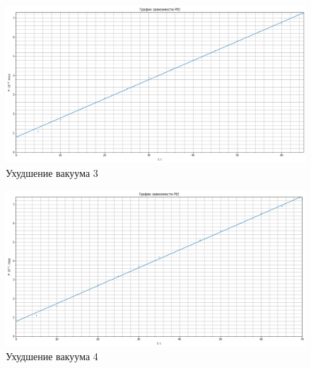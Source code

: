 \documentclass[a4paper,12pt]{article}
\theoremstyle{definition}
\begin{document}
	\begin{figure}[h!]
		\includegraphics[scale=0.43]{graphup3}
		\caption{Ухудшение вакуума 3}
		\label{graphup3}
	\end{figure}

	\begin{figure}[h!]
		\includegraphics[scale=0.43]{graphup4}
		\caption{Ухудшение вакуума 4}
		\label{graphup4}
	\end{figure}
	
	
	
	
	
\end{document}
